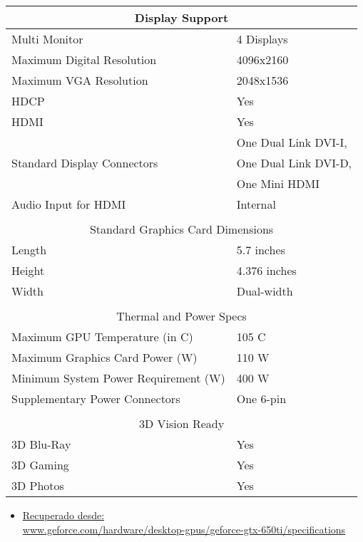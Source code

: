 \begin{table}[H]
  \begin{tabular}{ll}
  \hline
  \multicolumn{2}{|c|}{Display Support} \\ \hline
  \multicolumn{1}{|l|}{Multi Monitor} & \multicolumn{1}{l|}{4 Displays} \\ \hline
  \multicolumn{1}{|l|}{Maximum Digital Resolution} & \multicolumn{1}{l|}{4096x2160} \\ \hline
  \multicolumn{1}{|l|}{Maximum VGA Resolution} & \multicolumn{1}{l|}{2048x1536} \\ \hline
  \multicolumn{1}{|l|}{HDCP} & \multicolumn{1}{l|}{Yes} \\ \hline
  \multicolumn{1}{|l|}{HDMI} & \multicolumn{1}{l|}{Yes} \\ \hline
  \multicolumn{1}{|l|}{\multirow{3}{*}{Standard Display Connectors}} & \multicolumn{1}{l|}{One Dual Link DVI-I,} \\
  \multicolumn{1}{|l|}{} & \multicolumn{1}{l|}{One Dual Link DVI-D,} \\
  \multicolumn{1}{|l|}{} & \multicolumn{1}{l|}{One Mini HDMI} \\ \hline
  \multicolumn{1}{|l|}{Audio Input for HDMI} & \multicolumn{1}{l|}{Internal} \\ \hline
   &  \\ \hline
  \multicolumn{2}{|c|}{Standard Graphics Card Dimensions} \\ \hline
  \multicolumn{1}{|l|}{Length} & \multicolumn{1}{l|}{5.7 inches} \\ \hline
  \multicolumn{1}{|l|}{Height} & \multicolumn{1}{l|}{4.376 inches} \\ \hline
  \multicolumn{1}{|l|}{Width} & \multicolumn{1}{l|}{Dual-width} \\ \hline
   &  \\ \hline
  \multicolumn{2}{|c|}{Thermal and Power Specs} \\ \hline
  \multicolumn{1}{|l|}{Maximum GPU Temperature (in C)} & \multicolumn{1}{l|}{105 C} \\ \hline
  \multicolumn{1}{|l|}{Maximum Graphics Card Power (W)} & \multicolumn{1}{l|}{110 W} \\ \hline
  \multicolumn{1}{|l|}{Minimum System Power Requirement (W)} & \multicolumn{1}{l|}{400 W} \\ \hline
  \multicolumn{1}{|l|}{Supplementary Power Connectors} & \multicolumn{1}{l|}{One 6-pin} \\ \hline
   &  \\ \hline
  \multicolumn{2}{|c|}{3D Vision Ready} \\ \hline
  \multicolumn{1}{|l|}{3D Blu-Ray} & \multicolumn{1}{l|}{Yes} \\ \hline
  \multicolumn{1}{|l|}{3D Gaming} & \multicolumn{1}{l|}{Yes} \\ \hline
  \multicolumn{1}{|l|}{3D Photos} & \multicolumn{1}{l|}{Yes} \\ \hline
  \end{tabular}
\end{table}

\begin{itemize}
  \item \href{https://www.geforce.com/hardware/desktop-gpus/geforce-gtx-650ti/specifications}{Recuperado desde:\\ www.geforce.com/hardware/desktop-gpus/geforce-gtx-650ti/specifications}
\end{itemize}
